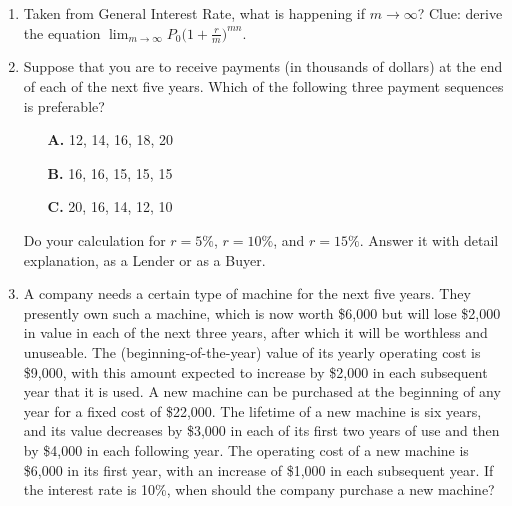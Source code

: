 \documentclass{article}
\begin{document}
	\begin{enumerate}
		\item Taken from General Interest Rate, what is happening if $m\rightarrow\infty$? Clue: derive the equation $\displaystyle\lim_{m\rightarrow\infty}P_0\big(1+\frac{r}{m}\big)^{mn}$.
		\item Suppose that you are to receive payments (in thousands
		of dollars) at the end of each of the next five years. Which of the following
		three payment sequences is preferable? 
		\begin{enumerate}
			\item [\textbf{A.}] 12, 14, 16, 18, 20
			\item [\textbf{B.}] 16, 16, 15, 15, 15
			\item [\textbf{C.}] 20, 16, 14, 12, 10
		\end{enumerate}
		Do your calculation for $r=5\%$, $r=10\%$, and $r=15\%$. Answer it with detail explanation, as a Lender or as a Buyer.
		\item A company needs a certain type of machine for the next
		five years. They presently own such a machine, which is now worth
		\$6,000 but will lose \$2,000 in value in each of the next three years, after
		which it will be worthless and unuseable. The (beginning-of-the-year)
		value of its yearly operating cost is \$9,000, with this amount expected
		to increase by \$2,000 in each subsequent year that it is used. A new machine
		can be purchased at the beginning of any year for a fixed cost of
		\$22,000. The lifetime of a new machine is six years, and its value decreases
		by \$3,000 in each of its first two years of use and then by \$4,000
		in each following year. The operating cost of a new machine is \$6,000 in its first year, with an increase of \$1,000 in each subsequent year. If the
		interest rate is 10\%, when should the company purchase a new machine? 
	\end{enumerate}
\end{document}
